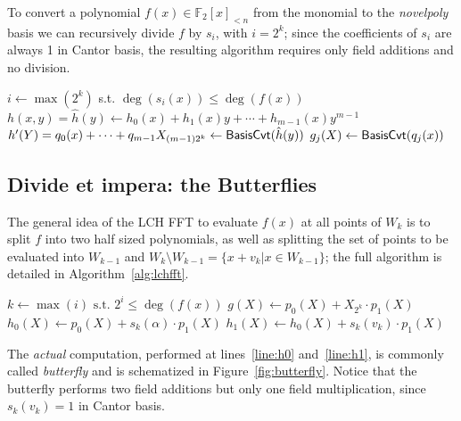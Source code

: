     To convert a polynomial $f(x) \in \mathds{F}_2[x]_{<n}$ from the monomial to the \emph{novelpoly} basis we can recursively divide $f$ by $s_i$, with $i=2^k$;
    since the coefficients of $s_i$ are always 1 in Cantor basis, the resulting algorithm requires only field additions and no division.

    \begin{algorithm2e}
        \caption{Basis conversion from monomial to \emph{novelpoly}}
        \label{alg:basiscvt}
         {
            \;
        }
        $i \gets \max(2^k)$ s.t. $\deg(s_i(x)) \leqslant \deg(f(x))$\;
        $h(x,y) = \hat{h}(y) \gets h_0(x) + h_1(x)y + \cdots + h_{m-1}(x)y^{m-1}$
        $h^{\prime}(Y) = q_0(x) + \cdots + q_{m-1}X_{(m-1)2^k} \gets \text{\textsf{BasisCvt}}(\hat{h}(y))$\;
         {
            $g_j(X) \gets \text{\textsf{BasisCvt}}(q_j(x))$\;
        }
        \;
    \end{algorithm2e}

\subsection{Divide et impera: the Butterflies}
    The general idea of the LCH FFT to evaluate $f(x)$ at all points of $W_k$ is to split $f$ into two half sized polynomials, as well
    as splitting the set of points to be evaluated into $W_{k-1}$ and $W_k\setminus W_{k-1} = \{x + v_k | x \in W_{k-1}\}$; the full algorithm
    is detailed in Algorithm~\ref{alg:lchfft}.

\begin{algorithm2e}[H]
    \caption{Lin-Chung-Han FFT}
    \label{alg:lchfft}
    $k \gets \max(i) \text{ s.t. } 2^i \leqslant \deg(f(x))$\;
    $g(X) \gets p_0(X) + X_{2^k}\cdot p_1(X)$\;
    $h_0(X) \gets p_0(X) + s_k(\alpha)\cdot p_1(X)$\;\label{line:h0}
    $h_1(X) \gets h_0(X) + s_k(v_k)\cdot p_1(X)$\;\label{line:h1}
    \;
\end{algorithm2e}
    The \textit{actual} computation, performed at lines~\ref{line:h0} and~\ref{line:h1}, is commonly called \emph{butterfly} and
    is schematized in Figure~\ref{fig:butterfly}. Notice that the butterfly performs two field additions but only one field multiplication,
    since $s_k(v_k) = 1$ in Cantor basis.


